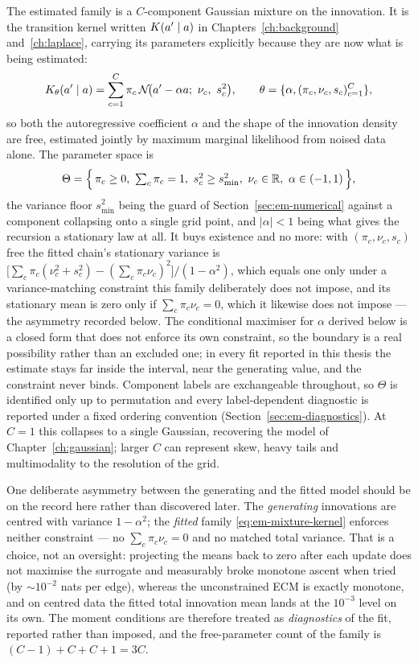 The estimated family is a $C$-component Gaussian mixture on the innovation. It
is the transition kernel written $K(a' \mid a)$ in
Chapters~\ref{ch:background} and~\ref{ch:laplace}, carrying its parameters
explicitly because they are now what is being estimated:
\begin{equation}
  K_\theta(a' \mid a) = \sum_{c=1}^{C} \pi_c \,
    \mathcal{N}\!\big(a' - \alpha a;\ \nu_c,\ s_c^2\big),
  \qquad \theta = \{\alpha, (\pi_c,\nu_c,s_c)_{c=1}^C\},
  \label{eq:em-mixture-kernel}
\end{equation}
so both the autoregressive coefficient $\alpha$ and the shape of the innovation
density are free, estimated jointly by maximum marginal likelihood from noised
data alone. The parameter space is
\begin{equation}
  \Theta = \Big\{\, \pi_c \geq 0,\ \textstyle\sum_c \pi_c = 1,\
    s_c^2 \geq s_{\min}^2,\ \nu_c \in \R,\
    \alpha \in (-1, 1) \,\Big\},
  \label{eq:em-parameter-space}
\end{equation}
the variance floor $s_{\min}^2$ being the guard of
Section~\ref{sec:em-numerical} against a component collapsing onto a single
grid point, and $|\alpha| < 1$ being what gives the recursion a stationary law
at all. It buys existence and no more: with $(\pi_c, \nu_c, s_c)$ free the
fitted chain's stationary variance is
$\big[\sum_c \pi_c(\nu_c^2 + s_c^2) - (\sum_c \pi_c \nu_c)^2\big]/(1-\alpha^2)$,
which equals one only under a variance-matching constraint this family
deliberately does not impose, and its stationary mean is zero only if
$\sum_c \pi_c \nu_c = 0$, which it likewise does not impose --- the asymmetry
recorded below. The conditional maximiser for
$\alpha$ derived below is a closed form that does not enforce its own
constraint, so the boundary is a real possibility rather than an excluded one;
in every fit reported in this thesis the estimate stays far inside the
interval, near the generating value, and the constraint never binds. Component
labels are exchangeable throughout, so $\Theta$ is identified only up to
permutation and every label-dependent diagnostic is reported under a fixed
ordering convention (Section~\ref{sec:em-diagnostics}). At $C=1$ this collapses to a single Gaussian, recovering the model
of Chapter~\ref{ch:gaussian}; larger $C$ can represent skew, heavy tails and
multimodality to the resolution of the grid.

One deliberate asymmetry between the generating and the fitted model should be
on the record here rather than discovered later. The \emph{generating}
innovations are centred with variance $1-\alpha^2$; the \emph{fitted} family
\eqref{eq:em-mixture-kernel} enforces neither constraint --- no
$\sum_c \pi_c\nu_c = 0$ and no matched total variance. That is a choice, not
an oversight: projecting the means back to zero after each update does not
maximise the surrogate and measurably broke monotone ascent when tried
(by $\sim 10^{-2}$ nats per edge), whereas the unconstrained ECM is exactly
monotone, and on centred data the fitted total innovation mean lands at the
$10^{-3}$ level on its own. The moment conditions are therefore treated as
\emph{diagnostics} of the fit, reported rather than imposed, and the
free-parameter count of the family is $(C-1) + C + C + 1 = 3C$. 


